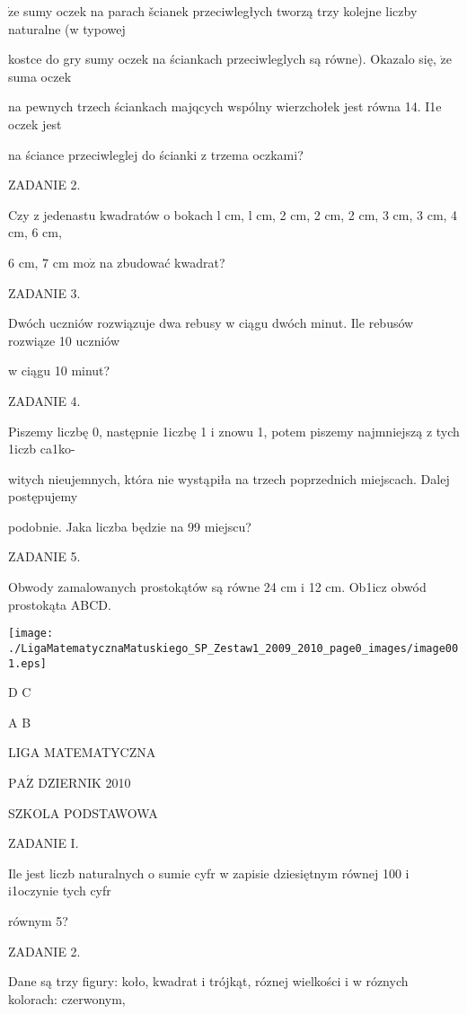 \documentclass[a4paper,12pt]{article}
\begin{document}
$\dot{\mathrm{z}}\mathrm{e}$ sumy oczek na parach šcianek przeciwległych tworzą trzy kolejne liczby naturalne (w typowej

kostce do gry sumy oczek na ściankach przeciwleglych są równe). Okazalo się, $\dot{\mathrm{z}}\mathrm{e}$ suma oczek

na pewnych trzech ściankach majqcych wspólny wierzchołek jest równa 14. I1e oczek jest

na ściance przeciwleglej do ścianki z trzema oczkami?

ZADANIE 2.

Czy z jedenastu kwadratów o bokach l cm, l cm, 2 cm, 2 cm, 2 cm, 3 cm, 3 cm, 4 cm, 6 cm,

6 cm, 7 cm $\mathrm{m}\mathrm{o}\dot{\mathrm{z}}$ na zbudować kwadrat?

ZADANIE 3.

Dwóch uczniów rozwiązuje dwa rebusy w ciągu dwóch minut. Ile rebusów rozwiąze 10 uczniów

w ciągu 10 minut?

ZADANIE 4.

Piszemy liczbę 0, następnie 1iczbę 1 i znowu 1, potem piszemy najmniejszą z tych 1iczb ca1ko-

witych nieujemnych, która nie wystąpiła na trzech poprzednich miejscach. Dalej postępujemy

podobnie. Jaka liczba będzie na 99 miejscu?

ZADANIE 5.

Obwody zamalowanych prostokątów są równe 24 cm i 12 cm. Ob1icz obwód prostokąta ABCD.
\begin{center}
\texttt{[image: ./LigaMatematycznaMatuskiego\_SP\_Zestaw1\_2009\_2010\_page0\_images/image001.eps]}
\end{center}
D  C

A  B






LIGA MATEMATYCZNA

$\mathrm{P}\mathrm{A}\acute{\mathrm{Z}}$ DZIERNIK 2010

SZKOLA PODSTAWOWA

ZADANIE I.

Ile jest liczb naturalnych o sumie cyfr w zapisie dziesiętnym równej 100 i i1oczynie tych cyfr

równym 5?

ZADANIE 2.

Dane są trzy figury: koło, kwadrat i trójkąt, róznej wielkości i w róznych kolorach: czerwonym,
\end{document}
